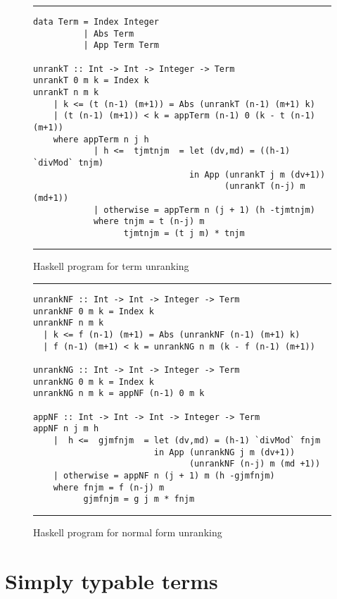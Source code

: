 \documentclass{jfp1}
\begin{document}
\begin{figure*}
\centering
\hrule

\medskip

\begin{verbatim}
data Term = Index Integer
          | Abs Term
          | App Term Term

unrankT :: Int -> Int -> Integer -> Term
unrankT 0 m k = Index k
unrankT n m k
    | k <= (t (n-1) (m+1)) = Abs (unrankT (n-1) (m+1) k)
    | (t (n-1) (m+1)) < k = appTerm (n-1) 0 (k - t (n-1) (m+1))
    where appTerm n j h
            | h <=  tjmtnjm  = let (dv,md) = ((h-1) `divMod` tnjm) 
                               in App (unrankT j m (dv+1)) 
                                      (unrankT (n-j) m (md+1))
            | otherwise = appTerm n (j + 1) (h -tjmtnjm) 
            where tnjm = t (n-j) m
                  tjmtnjm = (t j m) * tnjm 
\end{verbatim}
\hrule
\caption{\textsf{Haskell} program for term unranking}
\label{fig:prog-gen}
\end{figure*}

\begin{figure*}[!htb]
  \centering
\hrule
\medskip
\begin{verbatim}
unrankNF :: Int -> Int -> Integer -> Term
unrankNF 0 m k = Index k
unrankNF n m k
  | k <= f (n-1) (m+1) = Abs (unrankNF (n-1) (m+1) k)
  | f (n-1) (m+1) < k = unrankNG n m (k - f (n-1) (m+1))

unrankNG :: Int -> Int -> Integer -> Term
unrankNG 0 m k = Index k
unrankNG n m k = appNF (n-1) 0 m k
                                   
appNF :: Int -> Int -> Int -> Integer -> Term
appNF n j m h
    |  h <=  gjmfnjm  = let (dv,md) = (h-1) `divMod` fnjm
                        in App (unrankNG j m (dv+1)) 
                               (unrankNF (n-j) m (md +1))
    | otherwise = appNF n (j + 1) m (h -gjmfnjm)
    where fnjm = f (n-j) m                            
          gjmfnjm = g j m * fnjm
\end{verbatim}
\hrule
  \caption{\textsf{Haskell} program for normal form unranking}
  \label{fig:nf}
\end{figure*}

\section{Simply typable terms}
\label{sec:simply-typed-terms}
\end{document}
